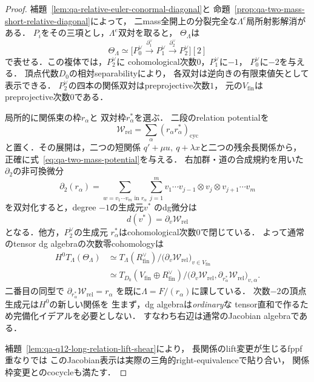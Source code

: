 \begin{proof}
補題~\ref{lem:qa-relative-euler-conormal-diagonal}と
命題~\ref{prop:qa-two-mass-short-relative-diagonal}によって，
二mass全開上の分裂完全な$\Lambda^e$局所射影解消がある．
$P_i$をその三項とし，$\Lambda^e$双対を取ると，
$\Theta_\Lambda$は
\[
 \Theta_\Lambda\simeq
 \bigl[P_0^\vee\xrightarrow{\partial_1^\vee}
       P_1^\vee\xrightarrow{\partial_2^\vee}
       P_2^\vee\bigr][2]
\]
で表せる．この複体では，$P_2^\vee$に
cohomological次数$0$，$P_1^\vee$に$-1$，
$P_0^\vee$に$-2$を与える．
頂点代数$D_0$の相対separabilityにより，
各双対は逆向きの有限束値矢として表示できる．
$P_2^\vee$の四本の関係双対はpreprojective次数$1$，
元の$V_{\mathrm{fin}}$はpreprojective次数$0$である．

局所的に関係束の枠$r_\alpha$と
双対枠$r_\alpha^*$を選ぶ．
二段のrelation potentialを
\[
 \mathcal W_{\mathrm{rel}}
   =\sum_\alpha (r_\alpha r_\alpha^*)_{\mathrm{cyc}}
 \tag{RP}\label{eq:qa-q12-relation-potential-contraction}
\]
と置く．その展開は，二つの短関係
$q'+\mu u,\ q+\lambda x$と二つの残余長関係から，
正確に式~\eqref{eq:qa-two-mass-potential}を与える．
右加群・道の合成規約を用いた
$\partial_2$の非可換微分
\[
 \partial_2(r_\alpha)
  =\sum_{w=v_1\cdots v_m\text{ in }r_\alpha}
    \sum_{j=1}^m
    v_1\cdots v_{j-1}\otimes v_j\otimes
      v_{j+1}\cdots v_m
\]
を双対化すると，degree $-1$の生成元$v^*$
のdg微分は
\[
 d(v^*)=\partial_v\mathcal W_{\mathrm{rel}}
\]
となる．他方，$P_2^\vee$の生成元
$r_\alpha^*$はcohomological次数$0$で閉じている．
よって通常のtensor dg algebraの次数零cohomologyは
\[
 \begin{aligned}
 H^0T_\Lambda(\Theta_\Lambda)
 &\simeq
 T_\Lambda(R_{\mathrm{fin}}^\vee)/
     \bigl(\partial_v\mathcal W_{\mathrm{rel}}\bigr)_{v\in V_{\mathrm{fin}}}\\
 &\simeq
 T_{D_0}(V_{\mathrm{fin}}\oplus R_{\mathrm{fin}}^\vee)/
   \bigl(
      \partial_v\mathcal W_{\mathrm{rel}},
      \partial_{r_\alpha^*}\mathcal W_{\mathrm{rel}}
   \bigr)_{v,\alpha}.
 \end{aligned}
\]
二番目の同型で
$\partial_{r_\alpha^*}\mathcal W_{\mathrm{rel}}=r_\alpha$
を既に$\Lambda=F/(r_\alpha)$に課している．
次数$-2$の頂点生成元は$H^0$の新しい関係を
生まず，dg algebraは\emph{ordinary}な
tensor直和で作るため完備化イデアルを必要としない．
すなわち右辺は通常のJacobian algebraである．

補題~\ref{lem:qa-q12-long-relation-lift-shear}により，
長関係のlift変更が生じるfppf重なりでは
このJacobian表示は実際の三角的right-equivalenceで貼り合い，
関係枠変更とのcocycleも満たす．


\end{proof}
